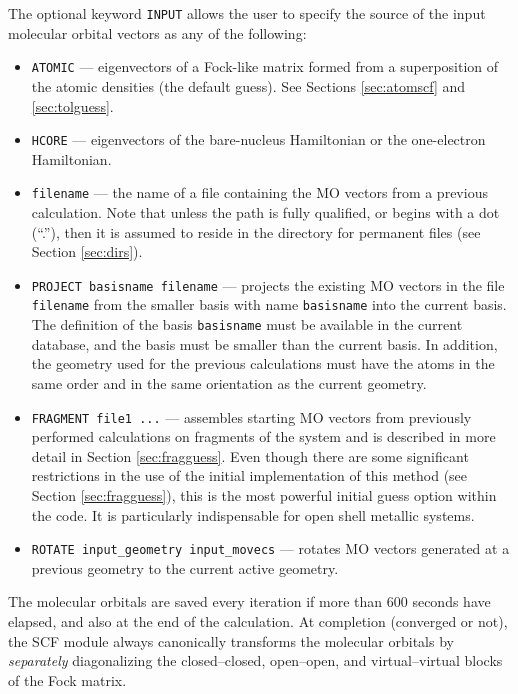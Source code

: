 The optional keyword \verb+INPUT+ allows the user to specify the
source of the input molecular orbital vectors as any of the following:
\begin{itemize}
\item \verb+ATOMIC+ --- eigenvectors of a Fock-like matrix formed from
  a superposition of the atomic densities (the default guess).  See
  Sections \ref{sec:atomscf} and \ref{sec:tolguess}.  
\item \verb+HCORE+ --- eigenvectors of the bare-nucleus Hamiltonian or
  the one-electron Hamiltonian.
\item \verb+filename+ --- the name of a file containing the MO vectors
  from a previous calculation.  Note that unless the path is fully
  qualified, or begins with a dot (``.''), then it is assumed to
  reside in the directory for permanent files (see Section
  \ref{sec:dirs}).
\item \verb+PROJECT basisname filename+ --- projects the existing MO
  vectors in the file \verb+filename+ from the smaller basis with name
  \verb+basisname+ into the current basis.  The definition of the
  basis \verb+basisname+ must be available in the current database,
  and the basis must be smaller than the current basis.  In addition,
  the geometry used for the previous calculations must have the atoms
  in the same order and in the same orientation as the current
  geometry.
\item \verb+FRAGMENT file1 ...+ --- assembles starting MO vectors from
  previously performed calculations on fragments of the system and is
  described in more detail in Section \ref{sec:fragguess}.  Even
  though there are some significant restrictions in the use of the
  initial implementation of this method (see Section
  \ref{sec:fragguess}), this is the most powerful initial guess option
  within the code.  It is particularly indispensable for open shell
  metallic systems.
\item \verb+ROTATE input_geometry input_movecs+ --- rotates 
   MO vectors generated at a previous geometry 
   to the current active geometry.
\end{itemize}
 
The molecular orbitals are saved every iteration if more than 600
seconds have elapsed, and also at the end of the calculation.  At
completion (converged or not), the SCF module always canonically
transforms the molecular orbitals by {\em separately} diagonalizing
the closed--closed, open--open, and virtual--virtual blocks of the
Fock matrix.

